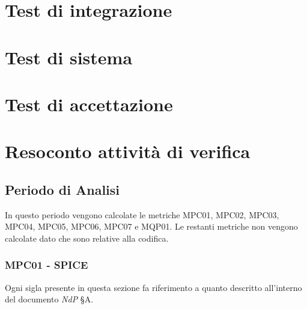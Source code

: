 \section{Test di integrazione}


\section{Test di sistema}


\section{Test di accettazione}


\section{Resoconto attività di verifica}

\subsection{Periodo di Analisi}
In questo periodo vengono calcolate le metriche MPC01, MPC02, MPC03, MPC04, MPC05, MPC06, MPC07 e MQP01. Le restanti metriche non vengono calcolate dato che sono relative alla codifica.

\subsubsection{MPC01 - SPICE}
Ogni sigla presente in questa sezione fa riferimento a quanto descritto all'interno del documento \textit{NdP} \S{A}.

